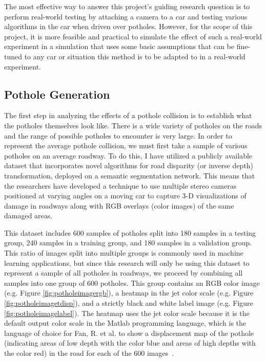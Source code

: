 \documentclass{article}
\begin{document}
The most effective way to answer this project's guiding research question is to perform real-world testing by attaching a camera to a car and testing various algorithms in the car when driven over potholes. However, for the scope of this project, it is more feasible and practical to simulate the effect of such a real-world experiment in a simulation that uses some basic assumptions that can be fine-tuned to any car or situation this method is to be adapted to in a real-world experiment.

\subsection{Pothole Generation}

The first step in analyzing the effects of a pothole collision is to establish what the potholes themselves look like. There is a wide variety of potholes on the roads and the range of possible potholes to encounter is very large. In order to represent the average pothole collision, we must first take a sample of various potholes on an average roadway. To do this, I have utilized a publicly available dataset that incorporates novel algorithms for road disparity (or inverse depth) transformation, deployed on a semantic segmentation network. This means that the researchers have developed a technique to use multiple stereo cameras positioned at varying angles on a moving car to capture 3-D visualizations of damage in roadways along with RGB overlays (color images) of the same damaged areas. 

This dataset includes 600 samples of potholes split into 180 samples in a testing group, 240 samples in a training group, and 180 samples in a validation group. This ratio of images split into multiple groups is commonly used in machine learning applications, but since this research will only be using this dataset to represent a sample of all potholes in roadways, we proceed by combining all samples into one group of 600 potholes. This group contains an RGB color image (e.g. Figure \ref{fig:potholeimagergb}), a heatmap in the jet color scale (e.g. Figure \ref{fig:potholeimagetdisp}), and a strictly black and white label image (e.g. Figure \ref{fig:potholeimagelabel}). The heatmap uses the jet color scale because it is the default output color scale in the Matlab programming language, which is the language of choice for Fan, R. et al. to show a displacement map of the pothole (indicating areas of low depth with the color blue and areas of high depths with the color red) in the road for each of the 600 images~\cite{8300645, 8809907, 8890001}.
\end{document}
